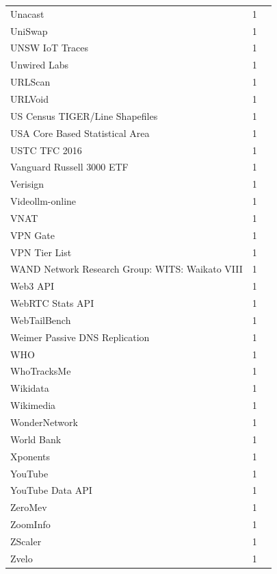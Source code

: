 \documentclass[11pt,a4paper]{article}
\begin{document}
\begin{longtable}{@{}p{} p{}p{}@{}}
Unacast & 1 & \cite{10.1007/978-3-030-98785-5_6} \\
UniSwap & 1 & \cite{10.1145/3777912.3809150} \\
UNSW IoT Traces & 1 & \cite{10.1145/3777912.3839801} \\
Unwired Labs & 1 & \cite{10.1145/3777912.3839813} \\
URLScan & 1 & \cite{10.1145/3777912.3809151} \\
URLVoid & 1 & \cite{10.1145/3777912.3839798} \\
US Census TIGER/Line Shapefiles & 1 & \cite{10.1145/3777912.3809140} \\
USA Core Based Statistical Area & 1 & \cite{10.1007/978-3-030-72582-2_15} \\
USTC TFC 2016 & 1 & \cite{10.1145/3777912.3839833} \\
Vanguard Russell 3000 ETF & 1 & \cite{10.1145/3646547.3689015} \\
Verisign & 1 & \cite{10.1145/3517745.3561434} \\
Videollm-online & 1 & \cite{10.1145/3777912.3839793} \\
VNAT & 1 & \cite{10.1145/3777912.3839833} \\
VPN Gate & 1 & \cite{10.1007/978-3-030-98785-5_23} \\
VPN Tier List & 1 & \cite{10.1007/978-3-031-28486-1_3} \\
WAND Network Research Group: WITS: Waikato VIII & 1 & \cite{10.1007/978-3-030-72582-2_32} \\
Web3 API & 1 & \cite{10.1145/3517745.3561448} \\
WebRTC Stats API & 1 & \cite{10.1145/3487552.3487842} \\
WebTailBench & 1 & \cite{10.1145/3777912.3839788} \\
Weimer Passive DNS Replication & 1 & \cite{10.1145/3517745.3561431} \\
WHO & 1 & \cite{10.1007/978-3-030-72582-2_3} \\
WhoTracksMe & 1 & \cite{10.1145/3730567.3764427} \\
Wikidata & 1 & \cite{10.1145/3777912.3839811} \\
Wikimedia & 1 & \cite{10.1007/978-3-032-18268-5_6} \\
WonderNetwork & 1 & \cite{10.1145/3730567.3764427} \\
World Bank & 1 & \cite{10.1145/3487552.3487822} \\
Xponents & 1 & \cite{10.1145/3618257.3624816} \\
YouTube & 1 & \cite{10.1007/978-3-031-56252-5_8} \\
YouTube Data API & 1 & \cite{10.1145/3730567.3764492} \\
ZeroMev & 1 & \cite{10.1145/3618257.3624824} \\
ZoomInfo & 1 & \cite{10.1145/3487552.3487853} \\
ZScaler & 1 & \cite{10.1145/3777912.3839799} \\
Zvelo & 1 & \cite{10.1145/3487552.3487853} \\
\hline
\end{longtable}
\end{document}
